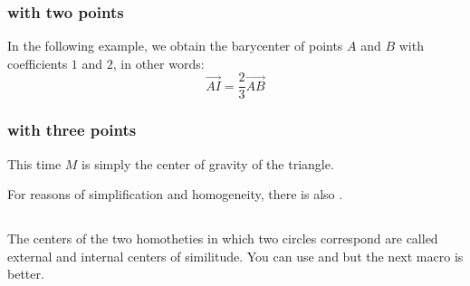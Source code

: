 \subsubsection{with two points}
In the following example, we obtain the barycenter of points $A$ and $B$ with coefficients $1$ and $2$, in other words:
\[
  \overrightarrow{AI}= \frac{2}{3}\overrightarrow{AB}
\]

\begin{tkzexample}[latex=7cm,small]
\end{tkzexample}

\subsubsection{with three points}
This time $M$ is simply the center of gravity of the triangle.

 For reasons of simplification and homogeneity, there is also .
\begin{tkzexample}[latex=7cm,small]
\end{tkzexample}


\subsection{}
The centers of the two homotheties in which two circles correspond are called external and internal centers of similitude. You can use  and  but the next macro is better.

